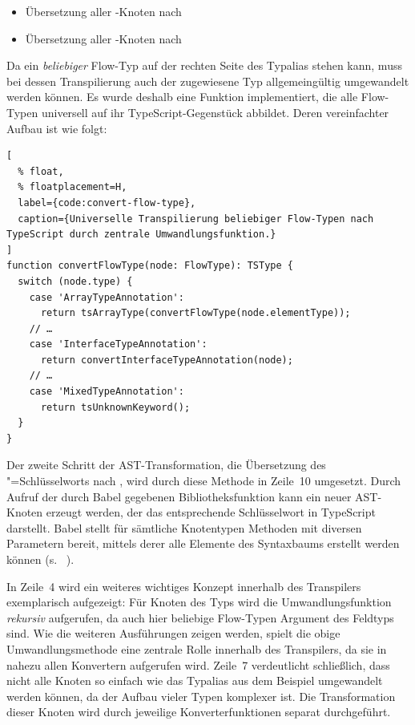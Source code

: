 {\begin{itemize}
  \item Übersetzung aller -Knoten nach 
  \item Übersetzung aller -Knoten nach 
\end{itemize}

Da ein \emph{beliebiger} Flow-Typ auf der rechten Seite des Typalias stehen kann, muss bei dessen Transpilierung auch der zugewiesene Typ allgemeingültig umgewandelt werden können. Es wurde deshalb eine Funktion implementiert, die alle Flow-Typen universell auf ihr TypeScript-Gegenstück abbildet. Deren vereinfachter Aufbau ist wie folgt:

\begin{lstlisting}[
  % float,
  % floatplacement=H,
  label={code:convert-flow-type},
  caption={Universelle Transpilierung beliebiger Flow-Typen nach TypeScript durch zentrale Umwandlungsfunktion.}
]
function convertFlowType(node: FlowType): TSType {
  switch (node.type) {
    case 'ArrayTypeAnnotation':
      return tsArrayType(convertFlowType(node.elementType));
    // …
    case 'InterfaceTypeAnnotation':
      return convertInterfaceTypeAnnotation(node);
    // …
    case 'MixedTypeAnnotation':
      return tsUnknownKeyword();
  }
}
\end{lstlisting}

Der zweite Schritt der AST-Transformation, die Übersetzung des "=Schlüsselworts nach , wird durch diese Methode in Zeile~10 umgesetzt. Durch Aufruf der durch Babel gegebenen Bibliotheksfunktion  kann ein neuer AST-Knoten erzeugt werden, der das entsprechende Schlüsselwort in TypeScript darstellt. Babel stellt für sämtliche Knotentypen Methoden mit diversen Parametern bereit, mittels derer alle Elemente des Syntaxbaums erstellt werden können (s. ~\autocite{BABEL:TYPES}).

In Zeile~4 wird ein weiteres wichtiges Konzept innerhalb des Transpilers exemplarisch aufgezeigt: Für Knoten des Typs  wird die Umwandlungsfunktion \emph{rekursiv} aufgerufen, da auch hier beliebige Flow-Typen Argument des Feldtyps sind. Wie die weiteren Ausführungen zeigen werden, spielt die obige Umwandlungsmethode eine zentrale Rolle innerhalb des Transpilers, da sie in nahezu allen Konvertern aufgerufen wird. Zeile~7 verdeutlicht schließlich, dass nicht alle Knoten so einfach wie das Typalias aus dem Beispiel umgewandelt werden können, da der Aufbau vieler Typen komplexer ist. Die Transformation dieser Knoten wird durch jeweilige Konverterfunktionen separat durchgeführt.

}
